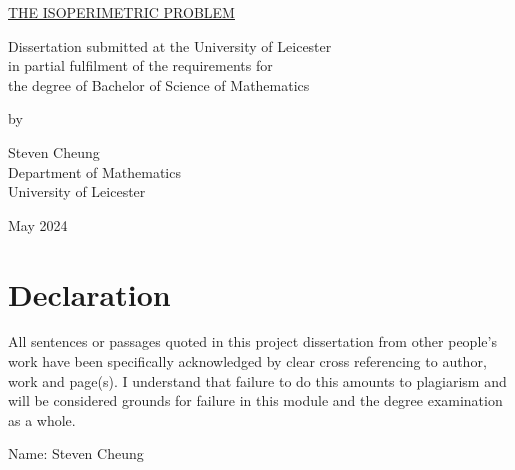 \documentclass[a4paper]{book}
\begin{document}
\begin{titlepage}\phantom{|}\vspace{0.75in}
\begin{center}
    \underline{THE ISOPERIMETRIC PROBLEM}
\end{center}
\begin{center}
    \underline{}
\end{center}
\vspace{1.5in}%
\begin{center}
    Dissertation submitted at the University of Leicester \\
    in partial fulfilment of the requirements for \\ 
    the degree of Bachelor of Science of Mathematics\\
\end{center}
\vspace{.5in}
\begin{center}
    by
\end{center}
\vspace{.5in}
\begin{center}
    Steven Cheung \\
    Department of Mathematics \\
    University of Leicester \\
\end{center}
\vspace{0.5in}
\begin{center}
    May 2024
\end{center}
\end{titlepage}

\tableofcontents
\thispagestyle{empty}
\chapter*{Declaration}                %
All sentences or passages quoted in this project dissertation from other
people's work have been specifically acknowledged by clear cross referencing
to author, work and page(s).  I understand that failure to do this amounts
to plagiarism and will be considered grounds for failure in this module and
the degree examination as a whole.


\bigskip

\noindent
Name: Steven Cheung


\bigskip
\end{document}
